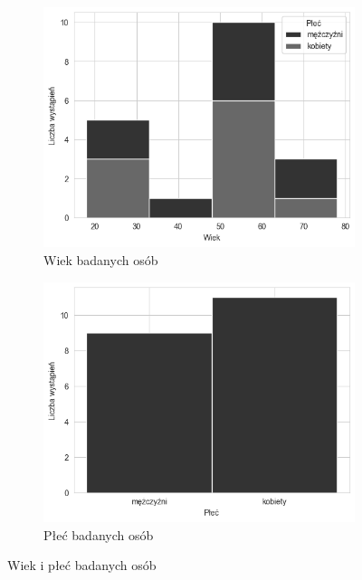 \documentclass{./assets/wfis}
\begin{document}
\begin{figure}[h!]
\begin{subfigure}[b]{0.45\textwidth}
    \centering
    \includegraphics[width=\columnwidth]{thesis/assets/age_histogram.png}
    \caption{Wiek badanych osób}
    \label{fig:age}
\end{subfigure}   
\hfill
\begin{subfigure}[b]{0.45\textwidth}
    \centering
    \includegraphics[width=\columnwidth]{thesis/assets/gender.png}
    \caption{Płeć badanych osób}
    \label{fig:gender}
\end{subfigure}
\caption{Wiek i płeć badanych osób}
\end{figure}
\end{document}
